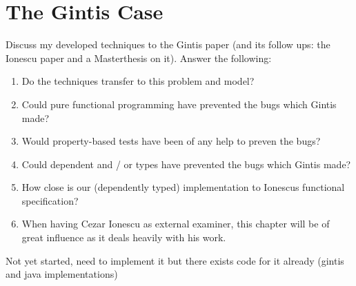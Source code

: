 \chapter{The Gintis Case}
\label{sec:gintis_case}
Discuss my developed techniques to the Gintis paper (and its follow ups: the Ionescu paper \cite{botta_functional_2011} and a Masterthesis \cite{evensen_extensible_2010} on it). Answer the following:

\begin{enumerate}
	\item Do the techniques transfer to this problem and model? 
	
	\item Could pure functional programming have prevented the bugs which Gintis made? 
	
	\item Would property-based tests have been of any help to preven the bugs?
	
	\item Could dependent and / or types have prevented the bugs which Gintis made? 
	
	\item How close is our (dependently typed) implementation to Ionescus functional specification? 
	
	\item When having Cezar Ionescu as external examiner, this chapter will be of great influence as it deals heavily with his work.

\end{enumerate}

Not yet started, need to implement it but there exists code for it already (gintis and java implementations)

%
%
%
%
